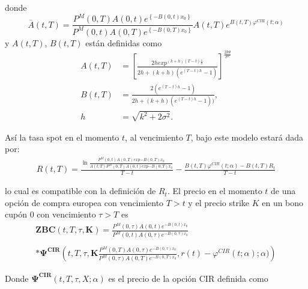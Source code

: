 \documentclass[11pt,notitlepage]{article}
\begin{document}
        donde
        \begin{equation*}
        \overline{A}(t,T)=\frac{P^{M}(0,T)A(0,t)e^{\left\{-B\left ( 0,t \right )x_{0} \right\}}}{P^{M}(0,t)A(0,T)e^{\left \{-B\left ( 0,T \right )x_{0}\right \}}}A(t,T)e^{B\left ( t,T \right )\varphi^{CIR}(t;\alpha)}
           \end{equation*}
        y \(A(t,T)\), \(B(t,T)\) están definidas como 
        \begin{align*}
            A(t,T)&=\left [ \frac{2h exp^{{(k+h)(T-t)\frac{1}{2}}}}{2h+(k+h)(e^{{(T-t)h}}-1)} \right ]^{\frac{2k\theta}{\sigma^{2}}}\\
            B(t,T)&=\frac{2\left ( e^{{(T-t)h}}-1 \right )}{2h+(k+h)\left ( e^{{(T-t)h}}-1 \right ) )},\\
            h&=\sqrt{k^{2}+2\sigma^{2}}.
        \end{align*}
        
        Así la tasa spot en el momento \(t\), al vencimiento \(T\), bajo este modelo estará dada por: 
        \begin{align*}
            R(t,T)= \frac{\ln{\frac{P^{M}(0,t)A(0,T)exp{-B\left ( 0,T \right )x_{0}}}{A(t,T)P^{M}(0,T)A(0,t)exp{-B\left ( 0,T \right )x_{0}}}}}{T-t}-\frac{B\left ( t,T \right) \varphi^{CIR}(t;\alpha)-B\left ( t,T \right )R_{t}}{T-t}
        \end{align*}
        
        lo cual es compatible con la definición de \(R_{t}\).
        El precio en el momento \(t\) de una opción de compra europea con vencimiento \(T > t\) y el precio strike \(K\) en un bono cupón \(0\) con vencimiento \(\tau>T\) es
        \begin{align*}
            \mathbf{ZBC}\left ( t,T,\tau,\mathbf{K} \right )=\frac{P^{M}(0,\tau)A(0,t)e^{{-B\left ( 0,t \right )}x_{0}}}{P^{M}(0,t)A(0,\tau)e^{{-B\left ( 0,\tau \right )}x_{0}}}\\
            \\
           * \mathbf{\Psi^{CIR}}\left ( t,T,\tau,\mathbf{K} \frac{P^{M}(0,T)A(0,\tau)e^{{-B\left ( 0,\tau \right )}x_{0}}}{P^{M}(0,\tau)A(0,T)e^{{-B\left ( 0,T \right )}x_{0}}},r(t)-\varphi ^{CIR}(t;\alpha);\alpha)\right )
        \end{align*}
        
        Donde \(\mathbf{\Psi ^{CIR}}\left ( t,T,\tau,X;\alpha \right )\) es el precio de la opción CIR definida como 
\end{document}
